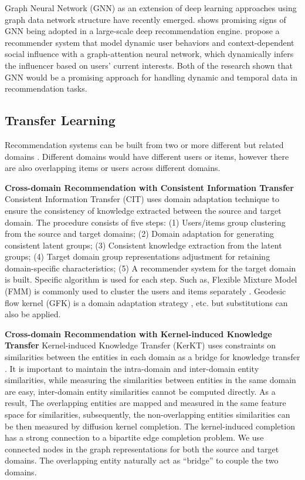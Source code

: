 Graph Neural Network (GNN) as an extension of deep learning approaches using graph data network structure have recently emerged. \citet{ying2018graph} shows promising signs of GNN being adopted in a large-scale deep recommendation engine. \citet{song2019session} propose a recommender system that model dynamic user behaviors and context-dependent social influence with a graph-attention neural network, which dynamically infers the influencer based on users’ current interests. Both of the research shown that GNN would be a promising approach for handling dynamic and temporal data in recommendation tasks.

\subsection{Transfer Learning}
Recommendation systems can be built from two or more different but related domains \citep{fernandez2012cross}. Different domains would have different users or items, however there are also overlapping items or users across different domains. 

\bigskip
\textbf{Cross-domain Recommendation with Consistent Information Transfer}
Consistent Information Transfer (CIT) uses domain adaptation technique to ensure the consistency of knowledge extracted between the source and target domain. 
The procedure consists of five steps: (1) Users/items group clustering from the source and target domains; (2) Domain adaptation for generating consistent latent groups; (3) Consistent knowledge extraction from the latent groups; (4) Target domain group representations adjustment for retaining domain-specific characteristics; (5) A recommender system for the target domain is built. Specific algorithm is used for each step. Such as, Flexible Mixture Model (FMM) is commonly used to cluster the users and items separately \citep{si2003flexible}. Geodesic flow kernel (GFK) is a domain adaptation strategy \citep{gong2014learning}, etc. but substitutions can also be applied.

\bigskip
\textbf{Cross-domain Recommendation with Kernel-induced Knowledge Transfer}
Kernel-induced Knowledge Transfer (KerKT) uses constraints on similarities between the entities in each domain as a bridge for knowledge transfer \citep{zhang2018cross}. It is important to maintain the intra-domain and inter-domain entity similarities, while measuring the similarities between entities in the same domain are easy, inter-domain entity similarities cannot be computed directly.  
As a result, The overlapping entities are mapped and measured in the same feature space for similarities, subsequently, the non-overlapping entities similarities can be then measured by diffusion kernel completion.
The kernel-induced completion has a strong connection to a bipartite edge completion problem\citep{he2016birank}. We use connected nodes in the graph representations for both the source and target domains. The overlapping entity naturally act as “bridge” to couple the two domains.


